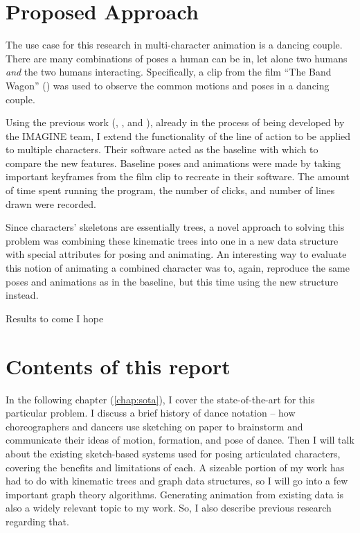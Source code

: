 \section{Proposed Approach}

The use case for this research in multi-character animation is a dancing couple. There are many combinations of poses a human can be in, let alone two humans \textit{and} the two humans interacting. Specifically, a clip from the film ``The Band Wagon'' (\citep{thebandwagon1953}) was used to observe the common motions and poses in a dancing couple.



Using the previous work (\citep{guay2013line}, \citep{guay2015adding}, and \citep{guay2015space}), already in the process of being developed by the IMAGINE team, I extend the functionality of the line of action to be applied to multiple characters. Their software acted as the baseline with which to compare the new features. Baseline poses and animations were made by taking important keyframes from the film clip to recreate in their software. The amount of time spent running the program, the number of clicks, and number of lines drawn were recorded.

Since characters' skeletons are essentially trees, a novel approach to solving this problem was combining these kinematic trees into one in a new data structure with special attributes for posing and animating. An interesting way to evaluate this notion of animating a combined character was to, again, reproduce the same poses and animations as in the baseline, but this time using the new structure instead.

Results to come I hope

\section{Contents of this report}

In the following chapter (\autoref{chap:sota}), I cover the state-of-the-art for this particular problem. I discuss a brief history of dance notation -- how choreographers and dancers use sketching on paper to brainstorm and communicate their ideas of motion, formation, and pose of dance. Then I will talk about the existing sketch-based systems used for posing articulated characters, covering the benefits and limitations of each. A sizeable portion of my work has had to do with kinematic trees and graph data structures, so I will go into a few important graph theory algorithms. Generating animation from existing data is also a widely relevant topic to my work. So, I also describe previous research regarding that.

